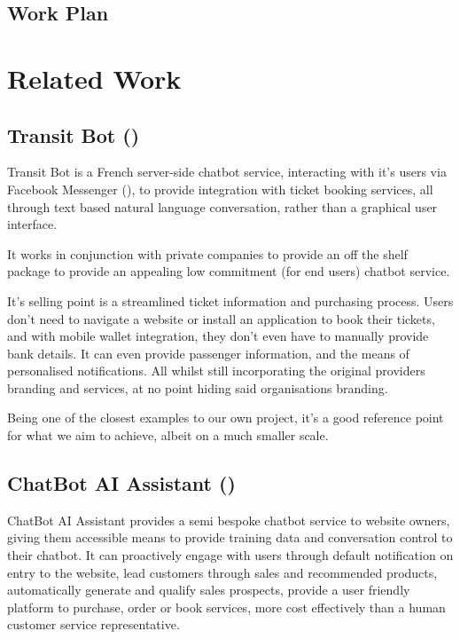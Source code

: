 \documentclass[11pt]{article}
\begin{document}
\subsection{Work Plan} \label{work-plan}


\section{Related Work} \label{related-work}

\subsection{Transit Bot (\cite{transitbot})} \label{transit-bot}

Transit Bot is a French server-side chatbot service, interacting with it's users via Facebook Messenger (\cite{messenger}), to provide integration with ticket booking services, all through text based natural language conversation, rather than a graphical user interface.

It works in conjunction with private companies to provide an off the shelf package to provide an appealing low commitment (for end users) chatbot service.

It's selling point is a streamlined ticket information and purchasing process. Users don't need to navigate a website or install an application to book their tickets, and with mobile wallet integration, they don't even have to manually provide bank details. It can even provide passenger information, and the means of personalised notifications. All whilst still incorporating the original providers branding and services, at no point hiding said organisations branding.

Being one of the closest examples to our own project, it's a good reference point for what we aim to achieve, albeit on a much smaller scale.

\subsection{ChatBot AI Assistant (\cite{chatbotai-assist})} \label{chatbot-ai-assistant}

ChatBot AI Assistant provides a semi bespoke chatbot service to website owners, giving them accessible means to provide training data and conversation control to their chatbot. It can proactively engage with users through default notification on entry to the website, lead customers through sales and recommended products, automatically generate and qualify sales prospects, provide a user friendly platform to purchase, order or book services, more cost effectively than a human customer service representative.
\end{document}
